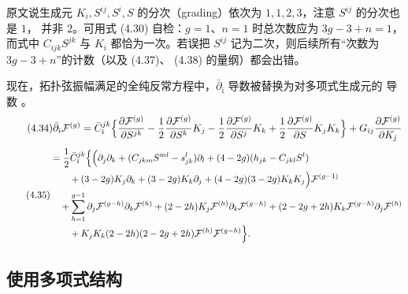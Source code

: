 \begin{yizhu}[易错点]
原文说生成元 $K_i,S^{ij},S^i,S$ 的分次（grading）依次为 $1,1,2,3$，注意 $S^{ij}$ 的分次也是 $1$，
并非 $2$。可用式 (4.30) 自检：$g=1$、$n=1$ 时总次数应为 $3g-3+n=1$，而式中 $C_{ijk}S^{jk}$ 与
$K_i$ 都恰为一次。若误把 $S^{ij}$ 记为二次，则后续所有“次数为 $3g-3+n$”的计数（以及 (4.37)、
(4.38) 的量纲）都会出错。
\end{yizhu}

现在，拓扑弦振幅满足的全纯反常方程中，$\bar\partial_{\bar\imath}$ 导数被替换为对多项式生成元的
导数 \cite{ref28,ref22}。
\begin{equation}\tag{4.34}
\bar\partial_{\bar\imath}\mathcal{F}^{(g)}
= \bar{C}^{jk}_{\bar\imath}\Bigl\{
  \frac{\partial\mathcal{F}^{(g)}}{\partial S^{jk}}
  - \frac{1}{2}\frac{\partial\mathcal{F}^{(g)}}{\partial S^k}K_j
  - \frac{1}{2}\frac{\partial\mathcal{F}^{(g)}}{\partial S^j}K_k
  + \frac{1}{2}\frac{\partial\mathcal{F}^{(g)}}{\partial S}K_jK_k \Bigr\}
+ G_{\bar\imath j}\frac{\partial\mathcal{F}^{(g)}}{\partial K_j}
\end{equation}
\begin{equation}\tag{4.35}
\begin{aligned}
&= \frac{1}{2}\bar{C}^{jk}_{\bar\imath}\Bigl\{
  \Bigl(\partial_j\partial_k + (C_{jkm}S^{ml} - s^l_{jk})\partial_l
  + (4-2g)(h_{jk} - C_{jkl}S^l) \\
&\qquad + (3-2g)K_j\partial_k + (3-2g)K_k\partial_j
  + (4-2g)(3-2g)K_kK_j\Bigr)\mathcal{F}^{(g-1)} \\
&\quad + \sum_{h=1}^{g-1}\partial_j\mathcal{F}^{(g-h)}\partial_k\mathcal{F}^{(h)}
  + (2-2h)K_j\mathcal{F}^{(h)}\partial_k\mathcal{F}^{(g-h)}
  + (2-2g+2h)K_k\mathcal{F}^{(g-h)}\partial_j\mathcal{F}^{(h)} \\
&\qquad + K_jK_k(2-2h)(2-2g+2h)\mathcal{F}^{(h)}\mathcal{F}^{(g-h)}
  \Bigr\}.
\end{aligned}
\end{equation}

\subsection{使用多项式结构}
\label{sec:4.5}

